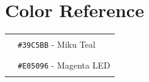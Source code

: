 \documentclass[12pt, a4paper]{article}
\newcommand{\code}[1]{\texttt{#1}}
\begin{document}

\appendix
\section{Color Reference}

\begin{center}
\begin{tabular}{ll}
    \textcolor{mikuteal}{\rule{1cm}{1cm}} & \code{\#39C5BB} - Miku Teal \\
    \textcolor{mikupink}{\rule{1cm}{1cm}} & \code{\#E05096} - Magenta LED \\
\end{tabular}
\end{center}
\end{document}
